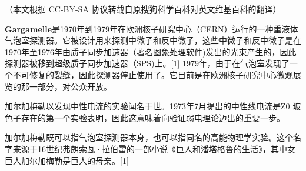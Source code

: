 
（本文根据 CC-BY-SA 协议转载自原搜狗科学百科对英文维基百科的翻译）

\textbf{Gargamelle}是1970年到1979年在欧洲核子研究中心（CERN）运行的一种重液体气泡室探测器。它被设计用来探测中微子和反中微子，这些中微子和反中微子是在1970年至1976年由质子同步加速器（著名图象处理软件)发出的光束产生的，因此探测器被移到超级质子同步加速器（SPS)上。[1] 1979年，由于在气泡室发现了一个不可修复的裂缝，因此探测器停止使用了。它目前是在欧洲核子研究中心微观展览的那一部分，对公众开放。

加尔加梅勒以发现中性电流的实验闻名于世。1973年7月提出的中性线电流是Z0 玻色子存在的第一个实验表明，因此这意味着向验证弱电理论迈出的重要一步。

加尔加梅勒既可以指气泡室探测器本身，也可以指同名的高能物理学实验。这个名字来源于16世纪弗朗索瓦·拉伯雷的一部小说《巨人和潘塔格鲁的生活》，其中女巨人加尔加梅勒是巨人的母亲。[1]